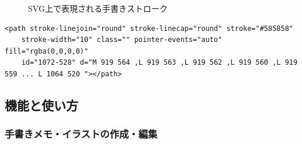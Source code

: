 \begin{figure}[htbp]
    \begin{center}
         \end{center}
    \caption{SVG上で表現される手書きストローク} \label{fig:tegakipath}
\end{figure}

\begin{lstlisting}[caption=図\ref{fig:tegakipath}の実体, label=code:tegakipathcode]
    <path stroke-linejoin="round" stroke-linecap="round" stroke="#585858"
    stroke-width="10" class="" pointer-events="auto" fill="rgba(0,0,0,0)"
    id="1072-528" d="M 919 564 ,L 919 563 ,L 919 562 ,L 919 560 ,L 919 559 ... L 1064 520 "></path>
\end{lstlisting}


\subsection{機能と使い方}

\subsubsection{手書きメモ・イラストの作成・編集}

